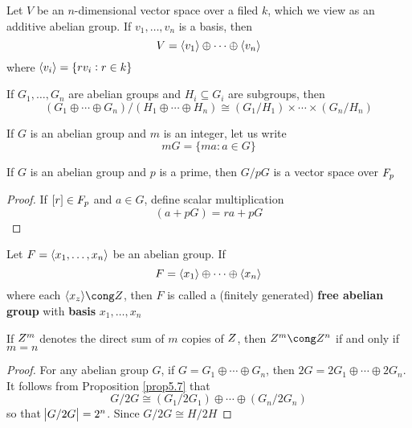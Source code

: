 \documentclass[11pt]{article}
\begin{document}
\begin{examplle}[]
Let \(V\) be an \(n\)-dimensional vector space over a filed \(k\), which we view
as an additive abelian group. If \(v_1,\dots,v_n\) is a basis, then
\begin{equation*}
V=\langle v_1\rangle\oplus\cdots\oplus\langle v_n\rangle
\end{equation*}
where \(\langle v_i\rangle=\{rv_i:r\in k\}\)
\end{examplle}

\begin{proposition}[]
\label{prop5.7}
If \(G_1,\dots,G_n\) are abelian groups and \(H_i\subseteq G_i\) are
subgroups, then
\begin{equation*}
(G_1\oplus\cdots\oplus G_n)/(H_1\oplus\cdots\oplus H_n)\cong(G_1/H_1)
\times\cdots\times(G_n/H_n)
\end{equation*}
\end{proposition}

If \(G\) is an abelian group and \(m\) is an integer, let us write
\begin{equation*}
mG=\{ma:a\in G\}
\end{equation*}

\begin{proposition}[]
If \(G\) is an abelian group and \(p\) is a prime, then \(G/pG\) is a vector
space over \(\relax{F}_p\)
\end{proposition}

\begin{proof}
If \([r]\in\relax{F}_p\) and \(a\in G\), define scalar multiplication
\begin{equation*}
[r](a+pG)=ra+pG
\end{equation*}
\end{proof}

\begin{definition}[]
Let \(F=\langle x_1,\dots,x_n\rangle\) be an abelian group. If 
\begin{equation*}
F=\langle x_1\rangle\oplus\cdots\oplus\langle x_n\rangle
\end{equation*}
where each \(\la x_z\ra\cong\Z\), then \(F\) is called a (finitely generated) 
\textbf{free abelian group} with \textbf{basis} \(x_1,\dots,x_n\)
\end{definition}

\begin{proposition}[]
If \(\relax{Z}^m\) denotes the direct sum of \(m\) copies of \(\relax{Z}\), then
\(\Z^m\cong\Z^n\) if and only if \(m=n\)
\end{proposition}

\begin{proof}
For any abelian group \(G\), if \(G=G_1\oplus\cdots\oplus G_n\), then
\(2G=2G_1\oplus\cdots\oplus 2G_n\). It follows from Proposition \ref{prop5.7}
that
\begin{equation*}
G/2G\cong(G_1/2G_1)\oplus\cdots\oplus(G_n/2G_n)
\end{equation*}
so that \(\abs{G/2G}=2^n\). Since \(G/2G\cong H/2H\)
\end{proof}
\end{document}
